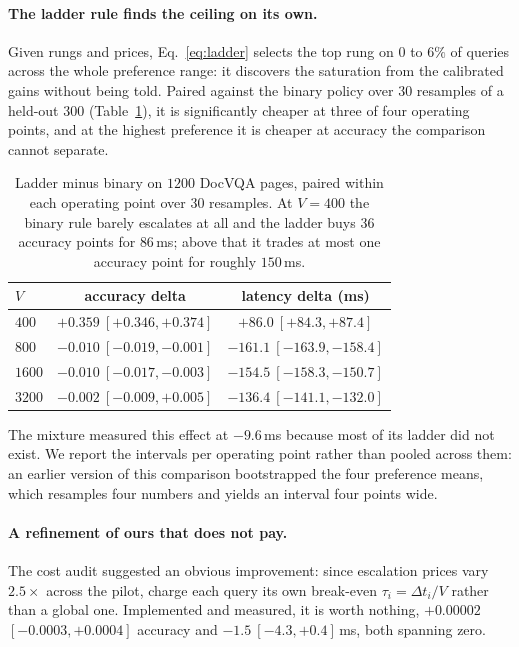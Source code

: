 \documentclass[10pt,twocolumn]{article}
\theoremstyle{plain}
\begin{document}
\paragraph{The ladder rule finds the ceiling on its own.} Given rungs and
prices, Eq.~\ref{eq:ladder} selects the top rung on $0$ to $6\%$ of queries
across the whole preference range: it discovers the saturation from the
calibrated gains without being told. Paired against the binary policy over $30$
resamples of a held-out $300$ (Table~\ref{tab:ladderdocvqa}), it is
significantly cheaper at three of four operating points, and at the highest
preference it is cheaper at accuracy the comparison cannot separate.

\begin{table}[t]
\centering\small
\setlength{\tabcolsep}{4pt}
\begin{tabular}{lcc}
\toprule
$V$ & accuracy delta & latency delta (ms) \\
\midrule
$400$  & $+0.359\ [+0.346, +0.374]$ & $+86.0\ [+84.3, +87.4]$ \\
$800$  & $-0.010\ [-0.019, -0.001]$ & $-161.1\ [-163.9, -158.4]$ \\
$1600$ & $-0.010\ [-0.017, -0.003]$ & $-154.5\ [-158.3, -150.7]$ \\
$3200$ & $-0.002\ [-0.009, +0.005]$ & $\mathbf{-136.4\ [-141.1, -132.0]}$ \\
\bottomrule
\end{tabular}
\caption{Ladder minus binary on $1200$ DocVQA pages, paired within each
operating point over $30$ resamples. At $V=400$ the binary rule barely escalates
at all and the ladder buys $36$ accuracy points for $86$\,ms; above that it
trades at most one accuracy point for roughly $150$\,ms.}
\label{tab:ladderdocvqa}
\end{table}

The mixture measured this effect at $-9.6$\,ms because most of its ladder did
not exist. We report the intervals per operating point rather than pooled across
them: an earlier version of this comparison bootstrapped the four preference
means, which resamples four numbers and yields an interval four points wide.

\paragraph{A refinement of ours that does not pay.} The cost audit suggested an
obvious improvement: since escalation prices vary $2.5\times$ across the pilot,
charge each query its own break-even $\tau_i = \Delta t_i / V$ rather than a
global one. Implemented and measured, it is worth nothing, $+0.00002$
$[-0.0003,+0.0004]$ accuracy and $-1.5\ [-4.3,+0.4]$\,ms, both spanning zero.
\end{document}

